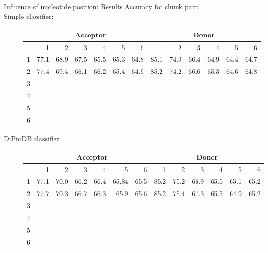 \documentclass[10pt]{beamer}
\begin{document}
\begin{frame}{Influence of nucleotide position: Results}
	Accuracy for chunk pair:\\
	Simple classifier:
	\begin{figure}
	\scriptsize
	\begingroup
	\centering
	\def\arraystretch{1.1}
	\begin{tabular}{|r|r|r|r|r|r|r|r|r|r|r|r|r|}
		\hline
		&\multicolumn{6}{c}{Acceptor}&\multicolumn{6}{|c|}{Donor}\\
		\hline
		&1&2&3&4&5&6&1&2&3&4&5&6\\
		\hline
		1&77.1&68.9&67.5&65.5&65.3&64.8&85.1&74.0&66.4&64.9&64.4&64.7\\
		2&77.4&69.4&66.1&66.2&65.4&64.9&85.2&74.2&66.6&65.3&64.6&64.8\\
		3&&&&&&&&&&&&\\
		4&&&&&&&&&&&&\\
		5&&&&&&&&&&&&\\
		6&&&&&&&&&&&&\\
		
		\hline 
	\end{tabular}
	\endgroup	
	\end{figure}

	DiProDB classifier:
	\begin{figure}
		\scriptsize
		\begingroup
		\centering
		\def\arraystretch{1.1}
		\begin{tabular}{|r|r|r|r|r|r|r|r|r|r|r|r|r|}
			\hline
			&\multicolumn{6}{c}{Acceptor}&\multicolumn{6}{|c|}{Donor}\\
			\hline
			&1&2&3&4&5&6&1&2&3&4&5&6\\
			\hline
			1&77.1&70.0&66.2&66.4&65.84&65.5&85.2&75.2&66.9&65.5&65.1&65.2\\
			2&77.7&70.3&66.7&66.3&65.9&65.6&85.2&75.4&67.3&65.5&64.9&65.2\\
			3&&&&&&&&&&&&\\
			4&&&&&&&&&&&&\\
			5&&&&&&&&&&&&\\
			6&&&&&&&&&&&&\\
			
			\hline 
		\end{tabular}
		\endgroup	
	\end{figure}
\end{frame}
\end{document}
